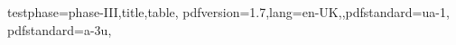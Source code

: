

\DocumentMetadata
 {
   testphase={phase-III,title,table},
   pdfversion=1.7,lang=en-UK,,pdfstandard=ua-1,
   pdfstandard=a-3u,
 }

\renewcommand\DocumentMetadata[1]{}


